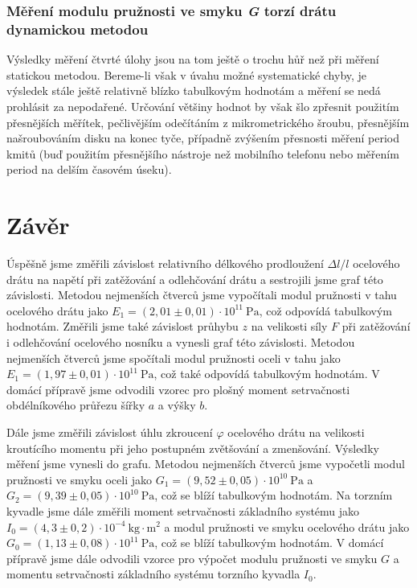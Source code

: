 \documentclass[english]{article}
\newcommand{\unit}[1]{\mathrm{#1}}
\begin{document}
			\subsubsection{Měření modulu pružnosti ve smyku \emph{G} torzí drátu dynamickou metodou}
					Výsledky měření čtvrté úlohy jsou na tom ještě o trochu hůř než při měření statickou metodou. Bereme-li však v úvahu možné systematické chyby, je výsledek stále ještě relativně blízko tabulkovým hodnotám a měření se nedá prohlásit za nepodařené. Určování většiny hodnot by však šlo zpřesnit použitím přesnějších měřítek, pečlivějším odečítáním z mikrometrického šroubu, přesnějším našroubováním disku na konec tyče, případně zvýšením přesnosti měření period kmitů (buď použitím přesnějšího nástroje než mobilního telefonu nebo měřením period na delším časovém úseku).
					
\section{Závěr}
		Úspěšně jsme změřili závislost relativního délkového prodloužení $\Delta l/l$ ocelového drátu na napětí při zatěžování a odlehčování drátu a sestrojili jsme graf této závislosti. Metodou nejmenších čtverců jsme vypočítali modul pružnosti v tahu ocelového drátu jako $E_1 = (2,01\pm0,01)       \cdot \unit{10^{11}\ Pa}$, což odpovídá tabulkovým hodnotám. Změřili jsme také závislost průhybu $z$ na velikosti síly $F$ při zatěžování i odlehčování ocelového nosníku a vynesli graf této závislosti. Metodou nejmenších čtverců jsme spočítali modul pružnosti oceli v tahu jako $E_1 = (1,97\pm0,01)       \cdot \unit{10^{11}\ Pa}$, což také odpovídá tabulkovým hodnotám. V domácí přípravě jsme odvodili vzorec pro plošný moment setrvačnosti obdélníkového průřezu šířky $a$ a výšky $b$. 

		Dále jsme změřili závislost úhlu zkroucení $\varphi$ ocelového drátu na velikosti kroutícího momentu při jeho postupném zvětšování a zmenšování. Výsledky měření jsme vynesli do grafu. Metodou nejmenších čtverců jsme vypočetli modul pružnosti ve smyku oceli jako $G_1 = (9,52\pm0,05)       \cdot \unit{10^{10}\ Pa}$ a $G_2 = (9,39\pm0,05)       \cdot \unit{10^{10}\ Pa}$, což se blíží tabulkovým hodnotám. Na torzním kyvadle jsme dále změřili moment setrvačnosti základního systému jako $I_0 = (4,3\pm0,2)       \cdot \unit{10^{-4}\ kg\cdot m^2}$ a modul pružnosti ve smyku ocelového drátu jako $G_0 = (1,13\pm0,08) \cdot \unit{10^{11}\ Pa}$, což se blíží tabulkovým hodnotám. V domácí přípravě jsme dále odvodili vzorce pro výpočet modulu pružnosti ve smyku $G$ a momentu setrvačnosti základního systému torzního kyvadla $I_0$.
	
\end{document}
